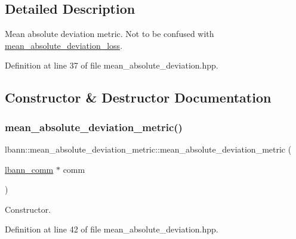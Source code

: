 \subsection{Detailed Description}
Mean absolute deviation metric. Not to be confused with \hyperlink{classlbann_1_1mean__absolute__deviation__loss}{mean\+\_\+absolute\+\_\+deviation\+\_\+loss}. 

Definition at line 37 of file mean\+\_\+absolute\+\_\+deviation.\+hpp.



\subsection{Constructor \& Destructor Documentation}
\mbox{\label{classlbann_1_1mean__absolute__deviation__metric_afb98a53d7a6f0981d80f5c74fd6ce25a}} 
\subsubsection{\texorpdfstring{mean\+\_\+absolute\+\_\+deviation\+\_\+metric()}{mean\_absolute\_deviation\_metric()}\hspace{0.1cm}{\footnotesize\ttfamily [1/2]}}
{\footnotesize\ttfamily lbann\+::mean\+\_\+absolute\+\_\+deviation\+\_\+metric\+::mean\+\_\+absolute\+\_\+deviation\+\_\+metric (\begin{DoxyParamCaption}\item[{\hyperlink{classlbann_1_1lbann__comm}{lbann\+\_\+comm} $\ast$}]{comm }\end{DoxyParamCaption})\hspace{0.3cm}{\ttfamily [inline]}}

Constructor. 

Definition at line 42 of file mean\+\_\+absolute\+\_\+deviation.\+hpp.


